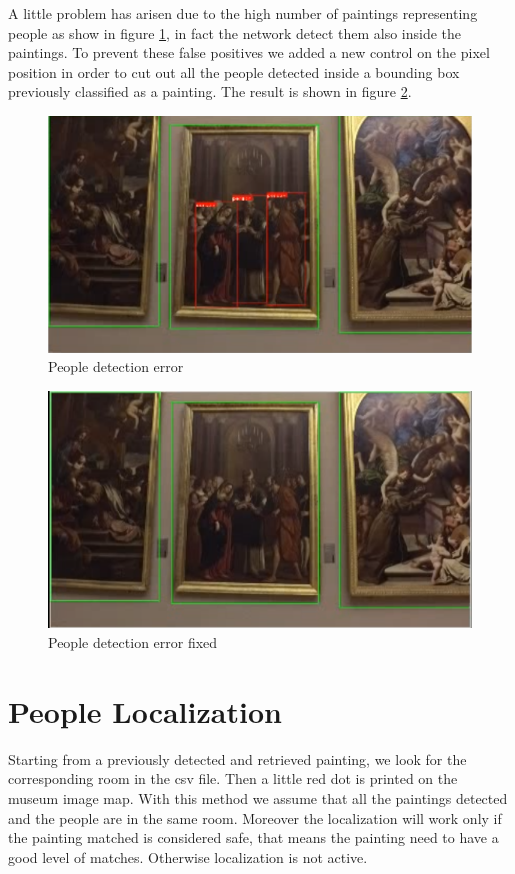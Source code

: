 \documentclass[conference]{IEEEtran}
\begin{document}
A little problem has arisen due to the high number of paintings representing people as show in figure \ref{fig_People_detection_error}, in fact the network detect them also inside the paintings. To prevent these false positives we added a new control on the pixel position in order to cut out all the people detected inside a bounding box previously classified as a painting. The result is shown in figure \ref{fig_People_detection_error_fixed}.\\

\begin{figure}[htbp]
\centerline{\includegraphics[width=0.8\columnwidth]{../people_detection/people_error.png}}
\caption{People detection error}
\label{fig_People_detection_error}
\end{figure}

\begin{figure}[htbp]
\centerline{\includegraphics[width=0.8\columnwidth]{../people_detection/people_error_fixed.png}}
\caption{People detection error fixed}
\label{fig_People_detection_error_fixed}
\end{figure}

\bigskip

\section{People Localization}
Starting from a previously detected and retrieved painting, we look for the corresponding room in the csv file. Then a little red dot is printed on the museum image map. With this method we assume that all the paintings detected and the people are in the same room.
Moreover the localization will work only if the painting matched is considered safe, that means the painting need to have a good level of matches. Otherwise localization is not active.\\
\end{document}
